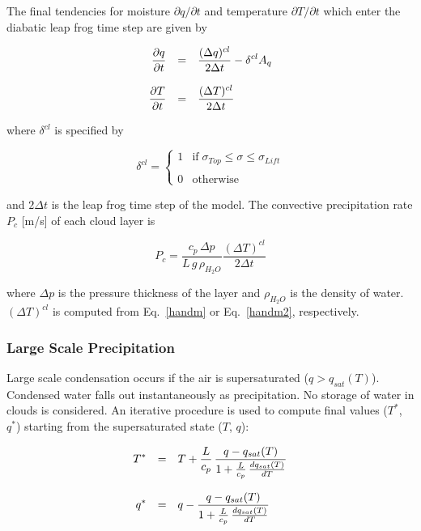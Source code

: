 The final tendencies for moisture $\partial q / \partial
t$ and temperature $\partial T / \partial t$
which enter the diabatic leap frog time step are given
by

\begin{equation}
\begin{array}{rcl}
\displaystyle \frac{\partial q}{\partial t} & = & \displaystyle \frac{(\Delta
q)^{cl}}{2 \Delta t} - {\delta}^{cl} A_q
\\
&& \\
\displaystyle \frac{\partial T}{\partial t} & = & \displaystyle \frac{(\Delta
T)^{cl}}{2 \Delta t} 
\end{array}
\end{equation}

where ${\delta}^{cl}$ is specified by

\begin{equation}
{\delta}^{cl} = \left\{ \begin{array}{ll} 1 & \mbox{if
} \;  \sigma_{Top} \le \sigma \le
\sigma_{Lift} \\ & \\ 0 & \mbox{otherwise}
\end{array} \right.
\end{equation}

and $2\Delta t$ is the leap frog time step of the model.
The convective precipitation rate
$P_{c}$ [m/s] of each cloud layer is

\begin{equation}
P_{c} =  \frac{c_p\, \Delta  p}{L\, g \, \rho_{H_2O}}
\frac{(\Delta T)^{cl}}{2\Delta t}
\end{equation} 

where $\Delta p$ is the pressure thickness of the layer
and $\rho_{H_2O}$ is the density of
water.  $(\Delta T)^{cl}$ is computed from
Eq.~\ref{handm} or Eq.~\ref{handm2},
respectively.

\subsubsection{Large Scale Precipitation}

Large scale condensation occurs if the air is
supersaturated ($q > q_{sat}(T)$). Condensed water
falls out
instantaneously as precipitation. No storage of water
in clouds is considered. An iterative procedure is used
to compute final
values ($T^*$, $q^*$) starting from the
supersaturated state  ($T$, $q$):

\begin{equation}\label{lsp1}
\begin{array}{rcl}
\displaystyle T^* & = & \displaystyle T + \frac{L}{c_p} \, \frac{q -
q_{sat}
(T)}{1+\frac{L}{c_p}\, \frac{dq_{sat}(T)}{dT}} \\
&&\\
\displaystyle q^* & = & \displaystyle q -\frac{q -
q_{sat}(T)}{1+\frac{L}{c_p}\,
\frac{dq_{sat}(T)}{dT}} 
\end{array}
\end{equation}

